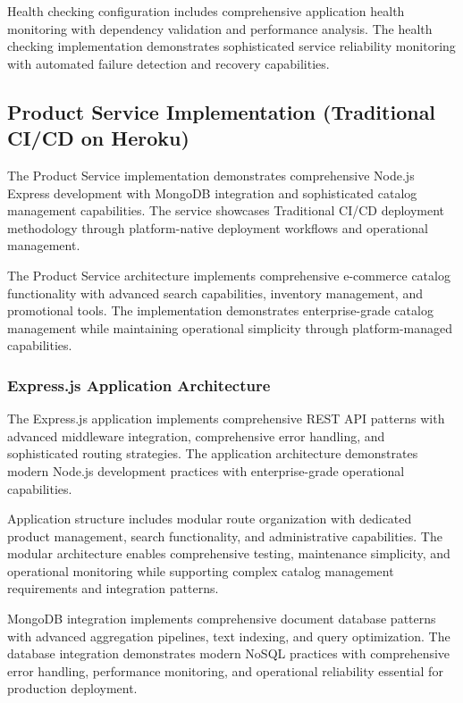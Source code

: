 Health checking configuration includes comprehensive application health monitoring with dependency validation and performance analysis. The health checking implementation demonstrates sophisticated service reliability monitoring with automated failure detection and recovery capabilities.

\subsection{Product Service Implementation (Traditional CI/CD on Heroku)}

The Product Service implementation demonstrates comprehensive Node.js Express development with MongoDB integration and sophisticated catalog management capabilities. The service showcases Traditional CI/CD deployment methodology through platform-native deployment workflows and operational management.

The Product Service architecture implements comprehensive e-commerce catalog functionality with advanced search capabilities, inventory management, and promotional tools. The implementation demonstrates enterprise-grade catalog management while maintaining operational simplicity through platform-managed capabilities.

\subsubsection{Express.js Application Architecture}

The Express.js application implements comprehensive REST API patterns with advanced middleware integration, comprehensive error handling, and sophisticated routing strategies. The application architecture demonstrates modern Node.js development practices with enterprise-grade operational capabilities.

Application structure includes modular route organization with dedicated product management, search functionality, and administrative capabilities. The modular architecture enables comprehensive testing, maintenance simplicity, and operational monitoring while supporting complex catalog management requirements and integration patterns.

MongoDB integration implements comprehensive document database patterns with advanced aggregation pipelines, text indexing, and query optimization. The database integration demonstrates modern NoSQL practices with comprehensive error handling, performance monitoring, and operational reliability essential for production deployment.

